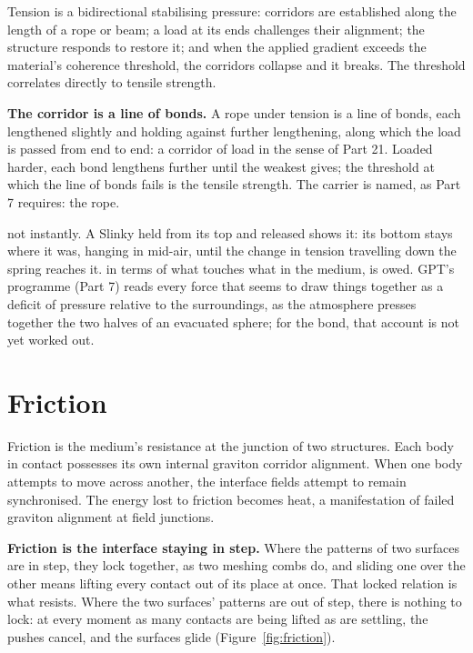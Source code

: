 Tension is a bidirectional stabilising pressure: corridors are established along the length of a rope or beam; a load at its ends challenges their alignment; the structure responds to restore it; and when the applied gradient exceeds the material's coherence threshold, the corridors collapse and it breaks. The threshold correlates directly to tensile strength.

\begin{hypbar}
\textbf{The corridor is a line of bonds.} A rope under tension is a line of bonds, each lengthened slightly and holding against further lengthening, along which the load is passed from end to end: a corridor of load in the sense of Part 21. Loaded harder, each bond lengthens further until the weakest gives; the threshold at which the line of bonds fails is the tensile strength. The carrier is named, as Part 7 requires: the rope.
\end{hypbar}

 not instantly. A Slinky held from its top and released shows it: its bottom stays where it was, hanging in mid-air, until the change in tension travelling down the spring reaches it.  in terms of what touches what in the medium, is owed. GPT's programme (Part 7) reads every force that seems to draw things together as a deficit of pressure relative to the surroundings, as the atmosphere presses together the two halves of an evacuated sphere; for the bond, that account is not yet worked out.

\section{Friction}

Friction is the medium's resistance at the junction of two structures. Each body in contact possesses its own internal graviton corridor alignment. When one body attempts to move across another, the interface fields attempt to remain synchronised. The energy lost to friction becomes heat, a manifestation of failed graviton alignment at field junctions.

\begin{hypbar}
\textbf{Friction is the interface staying in step.} Where the patterns of two surfaces are in step, they lock together, as two meshing combs do, and sliding one over the other means lifting every contact out of its place at once. That locked relation is what resists. Where the two surfaces' patterns are out of step, there is nothing to lock: at every moment as many contacts are being lifted as are settling, the pushes cancel, and the surfaces glide (Figure~\ref{fig:friction}).
\end{hypbar}

